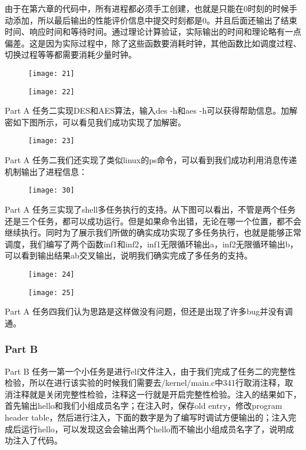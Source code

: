 \documentclass{whureport}
\begin{document}
由于在第六章的代码中，所有进程都必须手工创建，也就是只能在0时刻的时候手动添加，所以最后输出的性能评价信息中提交时刻都是0。并且后面还输出了结束时间、响应时间和等待时间。通过理论计算验证，实际输出的时间和理论略有一点偏差。这是因为实际过程中，除了这些函数要消耗时钟，其他函数比如调度过程、切换过程等等都需要消耗少量时钟。

\begin{figure}[H]
\centering
\texttt{[image: 21]}
\end{figure}

\begin{figure}[H]
\centering
\texttt{[image: 22]}
\end{figure}


Part A 任务二实现DES和AES算法，输入des -h和aes -h可以获得帮助信息。加解密如下图所示，可以看见我们成功实现了加解密。
\begin{figure}[H]
\centering
\texttt{[image: 23]}
\end{figure}

Part A 任务二我们还实现了类似linux的ps命令，可以看到我们成功利用消息传递机制输出了进程信息：

\begin{figure}[H]
\centering
\texttt{[image: 30]}
\end{figure}

Part A 任务三实现了shell多任务执行的支持。从下图可以看出，不管是两个任务还是三个任务，都可以成功运行。但是如果命令出错，无论在哪一个位置，都不会继续执行。同时为了展示我们所做的确实成功实现了多任务执行，也就是能够正常调度，我们编写了两个函数inf1和inf2，inf1无限循环输出a，inf2无限循环输出b，可以看到输出结果ab交叉输出，说明我们确实完成了多任务的支持。

\begin{figure}[H]
\centering
\texttt{[image: 24]}
\end{figure}

\begin{figure}[H]
\centering
\texttt{[image: 25]}
\end{figure}

Part A 任务四我们认为思路是这样做没有问题，但还是出现了许多bug并没有调通。

\subsubsection{Part B}
Part B 任务一第一个小任务是进行elf文件注入，由于我们完成了任务二的完整性检验，所以在进行该实验的时候我们需要去/kernel/main.c中341行取消注释，取消注释就是关闭完整性检验，注释这一行就是开启完整性检验。注入的结果如下，首先输出hello和我们小组成员名字；在注入时，保存old entry，修改program header table，然后进行注入，下面的数字是为了编写时调试方便输出的；注入完成后运行hello，可以发现这会会输出两个hello而不输出小组成员名字了，说明成功注入了代码。
\end{document}
